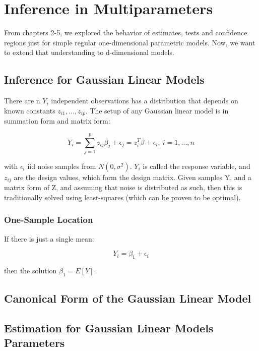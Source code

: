 \documentclass{article}
\theoremstyle{definition}
\theoremstyle{remark}
\begin{document}












\section{Inference in Multiparameters}
	From chapters 2-5, we explored the behavior of estimates, tests and confidence regions just for simple regular one-dimensional parametric models. Now, we want to extend that understanding to d-dimensional models.

	\subsection{Inference for Gaussian Linear Models}

		There are n $Y_i$ independent observations has a distribution that depends on known constants $z_{i1}, ..., z_{ip}$. The setup of any Gaussian linear model is in summation form and matrix form:

		$$Y_i = \sum_{j=1}^p z_{ij} \beta_j + \epsilon_j = z_i^T\beta + \epsilon_i,\ i=1,...,n$$

		with $\epsilon_i$ iid noise samples from $N(0, \sigma^2)$. $Y_i$ is called the response variable, and $z_{ij}$ are the design values, which form the design matrix. Given samples Y, and a matrix form of Z, and assuming that noise is distributed as such, then this is traditionally solved using least-squares (which can be proven to be optimal). 

		\subsubsection{One-Sample Location}
			If there is just a single mean:

			$$Y_i = \beta_1 + \epsilon_i$$

			then the solution $\beta_1 = E[Y]$.

	\subsection{Canonical Form of the Gaussian Linear Model}


	\subsection{Estimation for Gaussian Linear Models Parameters}
\end{document}
